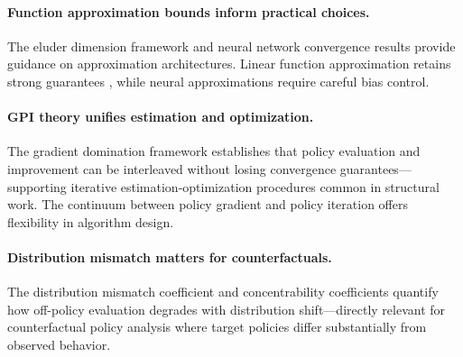 \paragraph{Function approximation bounds inform practical choices.} The eluder dimension framework \citep{wang2020eluder} and neural network convergence results \citep{fan2020dqn,gaur2023fqi} provide guidance on approximation architectures. Linear function approximation retains strong guarantees \citep{bhandari2021finite}, while neural approximations require careful bias control.

\paragraph{GPI theory unifies estimation and optimization.} The gradient domination framework establishes that policy evaluation and improvement can be interleaved without losing convergence guarantees---supporting iterative estimation-optimization procedures common in structural work. The continuum between policy gradient and policy iteration \citep{xiao2022convergence} offers flexibility in algorithm design.

\paragraph{Distribution mismatch matters for counterfactuals.} The distribution mismatch coefficient \citep{agarwal2021theory} and concentrability coefficients \citep{li2024offline} quantify how off-policy evaluation degrades with distribution shift---directly relevant for counterfactual policy analysis where target policies differ substantially from observed behavior.
